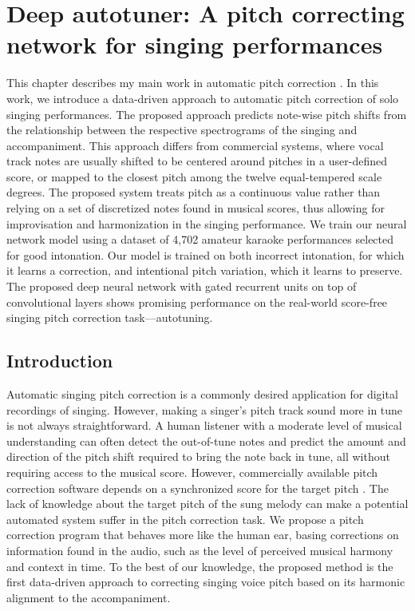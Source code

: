 \chapter{Deep autotuner: A pitch correcting network for singing performances}
\label{sec:thesis-autotuner}
This chapter describes my main work in automatic pitch correction \cite{wager2020deep}. In this work, we introduce a data-driven approach to automatic pitch correction of solo singing performances. The proposed approach predicts note-wise pitch shifts from the relationship between the respective spectrograms of the singing and accompaniment. This approach differs from commercial systems, where vocal track notes are usually shifted to be centered around pitches in a user-defined score, or mapped to the closest pitch among the twelve equal-tempered scale degrees. The proposed system treats pitch as a continuous value rather than relying on a set of discretized notes found in musical scores, thus allowing for improvisation and harmonization in the singing performance. We train our neural network model using a dataset of 4,702 amateur karaoke performances selected for good intonation. Our model is trained on both incorrect intonation, for which it learns a correction, and intentional pitch variation, which it learns to preserve. The proposed deep neural network with gated recurrent units on top of convolutional layers shows promising performance on the real-world score-free singing pitch correction task---autotuning. 

\section{Introduction}
\label{sec:intro-autotune}
Automatic singing pitch correction is a commonly desired application for digital recordings of singing. However, making a singer's pitch track sound more in tune is not always straightforward. A human listener with a moderate level of musical understanding can often detect the out-of-tune notes and predict the amount and direction of the pitch shift required to bring the note back in tune, all without requiring access to the musical score. However, commercially available pitch correction software depends on a synchronized score for the target pitch \cite{antares:2016}. The lack of knowledge about the target pitch of the sung melody can make a potential automated system suffer in the pitch correction task. We propose a pitch correction program that behaves more like the human ear, basing corrections on information found in the audio, such as the level of perceived musical harmony and context in time. To the best of our knowledge, the proposed method is the first data-driven approach to correcting singing voice pitch based on its harmonic alignment to the accompaniment.

